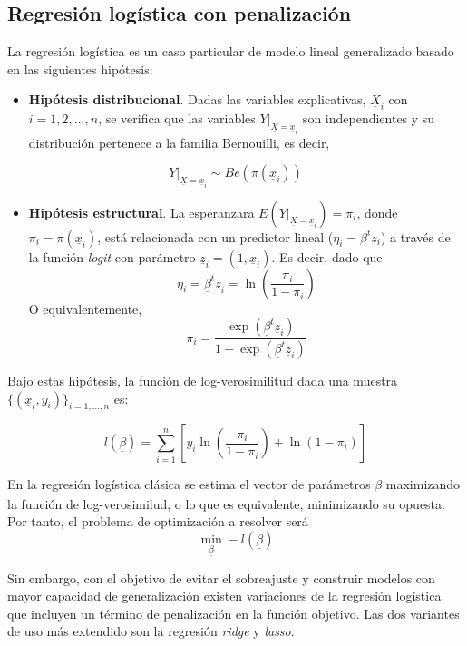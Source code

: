\documentclass[12pt,a4paper,]{book}
\providecommand{\tightlist}{%
  \setlength{\itemsep}{0pt}\setlength{\parskip}{0pt}}
\numberwithin{dummy}{section}
\theoremstyle{ocrenumbox}
\theoremstyle{blacknumex}
\theoremstyle{blacknumbox}
\theoremstyle{ocrenum}
\theoremstyle{ocrenum}
\begin{document}
\hypertarget{regresiuxf3n-loguxedstica-con-penalizaciuxf3n}{%
\subsection{Regresión logística con
penalización}\label{regresiuxf3n-loguxedstica-con-penalizaciuxf3n}}

La regresión logística es un caso particular de modelo lineal
generalizado basado en las siguientes hipótesis:

\begin{itemize}
\tightlist
\item
  \textbf{Hipótesis distribucional}. Dadas las variables explicativas,
  \(\underline X_i\) con \(i = 1,2,...,n\), se verifica que las
  variables \(Y|_{\underline X= \underline x_i}\) son independientes y
  su distribución pertenece a la familia Bernouilli, es decir,
\end{itemize}

\[Y|_{\underline X= \underline x_i} \sim Be(\pi( \underline x_i))\]

\begin{itemize}
\tightlist
\item
  \textbf{Hipótesis estructural}. La esperanzara
  \(E(Y|_{\underline X = \underline x_i}) = \pi_i\), donde
  \(\pi_i = \pi( \underline x_i)\), está relacionada con un predictor
  lineal (\(\eta_i = \beta^t z_i\)) a través de la función \emph{logit}
  con parámetro \(\underline z_i = \left(1,\underline x_i\right)\). Es
  decir, dado que
  \[\eta_i = \underline \beta^t \underline z_i= \ln\left(\frac{\pi_i}{1-\pi_i}\right)\]
  O equivalentemente,
  \[\pi_i = \frac{\exp(\underline \beta^t \underline z_i)}{1 + \exp(\underline \beta^t \underline z_i)}\]
\end{itemize}

Bajo estas hipótesis, la función de log-verosimilitud dada una muestra
\(\{ (\underline x_i,y_i) \}_{i=1,...,n}\) es:

\[ l(\underline \beta) = 
\sum_{i=1}^n \left[ 
y_i\ln \left( \frac{\pi_i}{1-\pi_i} \right) + 
\ln \left( 1 - \pi_i\right) \right]\]

En la regresión logística clásica se estima el vector de parámetros
\(\underline \beta\) maximizando la función de log-verosimilud, o lo que
es equivalente, minimizando su opuesta. Por tanto, el problema de
optimización a resolver será
\[\min_{\underline \beta} -l(\underline \beta)\]

Sin embargo, con el objetivo de evitar el sobreajuste y construir
modelos con mayor capacidad de generalización existen variaciones de la
regresión logística que incluyen un término de penalización en la
función objetivo. Las dos variantes de uso más extendido son la
regresión \emph{ridge} y \emph{lasso}.
\end{document}
